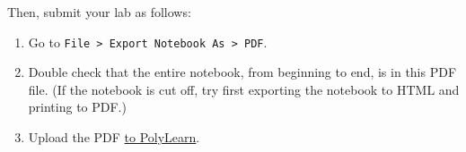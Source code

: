 \documentclass[11pt]{article}
\providecommand{\tightlist}{%
      \setlength{\itemsep}{0pt}\setlength{\parskip}{0pt}}
\begin{document}
Then, submit your lab as follows:

\begin{enumerate}
\def\labelenumi{\arabic{enumi}.}
\tightlist
\item
  Go to
  \texttt{File\ \textgreater{}\ Export\ Notebook\ As\ \textgreater{}\ PDF}.
\item
  Double check that the entire notebook, from beginning to end, is in
  this PDF file. (If the notebook is cut off, try first exporting the
  notebook to HTML and printing to PDF.)
\item
  Upload the PDF
  \href{https://polylearn.calpoly.edu/AY_2018-2019/mod/assign/view.php?id=336786}{to
  PolyLearn}.
\end{enumerate}


    
    
    
    
\end{document}

